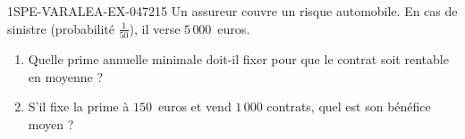 \begin{exercice}{1SPE-VARALEA-EX-047}{2}{15}
Un assureur couvre un risque automobile. En cas de sinistre (probabilité $\frac{1}{50}$), il verse $5\,000$~euros.

\begin{enumerate}
  \item Quelle prime annuelle minimale doit-il fixer pour que le contrat soit rentable en moyenne ?
  \item S'il fixe la prime à $150$~euros et vend $1\,000$ contrats, quel est son bénéfice moyen ?
\end{enumerate}
\end{exercice}
